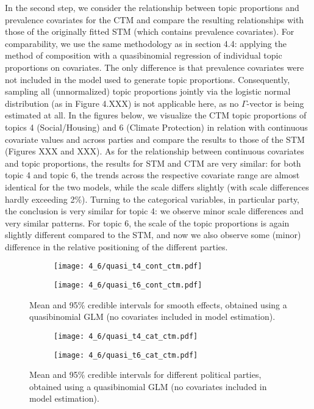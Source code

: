 \documentclass[12pt]{article}
\begin{document}
In the second step, we consider the relationship between topic proportions and prevalence covariates for the CTM and compare the resulting relationships with those of the originally fitted STM (which contains prevalence covariates). For comparability, we use the same methodology as in section 4.4: applying the method of composition with a quasibinomial regression of individual topic proportions on covariates. The only difference is that prevalence covariates were not included in the model used to generate topic proportions. Consequently, sampling all (unnormalized) topic proportions jointly via the logistic normal distribution (as in Figure 4.XXX) is not applicable here, as no $\Gamma$-vector is being estimated at all. In the figures below, we visualize the CTM topic proportions of topics 4 (Social/Housing) and 6 (Climate Protection) in relation with continuous covariate values and across parties and compare the results to those of the STM (Figures XXX and XXX). As for the relationship between continuous covariates and topic proportions, the results for STM and CTM are very similar: for both topic 4 and topic 6, the trends across the respective covariate range are almost identical for the two models, while the scale differs slightly (with scale differences hardly exceeding 2\%). Turning to the categorical variables, in particular party, the conclusion is very similar for topic 4: we observe minor scale differences and very similar patterns. For topic 6, the scale of the topic proportions is again slightly different compared to the STM, and now we also observe some (minor) difference in the relative positioning of the different parties. 

\begin{figure}[h!]
  \centering
  \captionsetup{justification=centering,margin=2cm}
  \begin{subfigure}[b]{0.4\linewidth}
    \texttt{[image: 4\_6/quasi\_t4\_cont\_ctm.pdf]}
  \end{subfigure}
  \begin{subfigure}[b]{0.4\linewidth}
    \texttt{[image: 4\_6/quasi\_t6\_cont\_ctm.pdf]}
  \end{subfigure}
  \caption{Mean and 95\% credible intervals for smooth effects, obtained
using a quasibinomial GLM (no covariates included in model estimation).}
  \label{fig:quasi_t46_cont_ctm}
\end{figure}

\begin{figure}[h!]
  \centering
  \captionsetup{justification=centering,margin=2cm}
  \begin{subfigure}[b]{0.4\linewidth}
    \texttt{[image: 4\_6/quasi\_t4\_cat\_ctm.pdf]}
  \end{subfigure}
  \begin{subfigure}[b]{0.4\linewidth}
    \texttt{[image: 4\_6/quasi\_t6\_cat\_ctm.pdf]}
  \end{subfigure}
  \caption{Mean and 95\% credible intervals for different political parties,
obtained using a quasibinomial GLM (no covariates included in model estimation).}
  \label{fig:quasi_t46_cat_ctm}
\end{figure}
\end{document}
